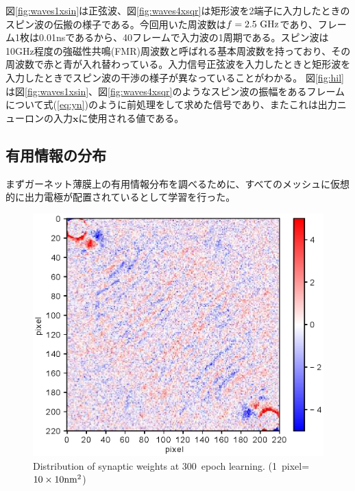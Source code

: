 \documentclass[a4j, twocolumn]{jsarticle}
\begin{document}
図\ref{fig:waves1xsin}は正弦波、図\ref{fig:waves4xsqr}は矩形波を2端子に入力したときのスピン波の伝搬の様子である。今回用いた周波数は$f=2.5~\rm{GHz}$であり、フレーム1枚は0.01nsであるから、40フレームで入力波の1周期である。スピン波は10GHz程度の強磁性共鳴(FMR)周波数と呼ばれる基本周波数を持っており、その周波数で赤と青が入れ替わっている。入力信号正弦波を入力したときと矩形波を入力したときでスピン波の干渉の様子が異なっていることがわかる。
図\ref{fig:hil}は図\ref{fig:waves1xsin}、図\ref{fig:waves4xsqr}のようなスピン波の振幅をあるフレームについて式(\ref{eq:yn})のように前処理をして求めた信号であり、またこれは出力ニューロンの入力$\bm{x}$に使用される値である。

\subsection{有用情報の分布}
\label{subsec:info}

まずガーネット薄膜上の有用情報分布を調べるために、すべてのメッシュに仮想的に出力電極が配置されているとして学習を行った。

\begin{figure}
\centering
\includegraphics[width=1\hsize]{./figures/meanweightsinsqr128_32i_l_hilsinsqr128_32i_t_hil_timesequence_epoch300_batchsize32_mask10_eta30_transition0.eps} 
\caption{Distribution of synaptic weights at 300~epoch learning. (1~pixel=$10\times10 \rm{nm^2}$)}
\label{fig:weightsinsqr128_32i}
\end{figure}
\end{document}
